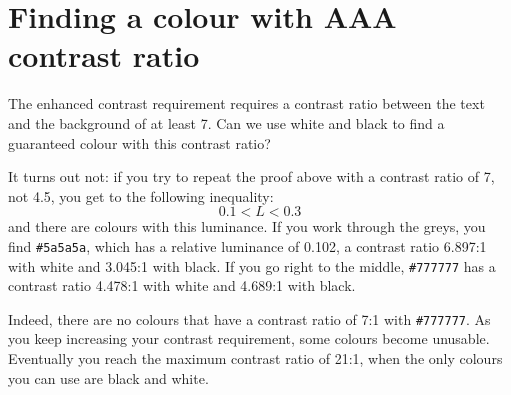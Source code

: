 \documentclass[12pt]{article}
\begin{document}

  \section*{Finding a colour with AAA contrast ratio} %
  \label{sec:finding_a_colour_with_aaa_contrast_ratio}

  The enhanced contrast requirement requires a contrast ratio between the text and the background of at least 7.
  Can we use white and black to find a guaranteed colour with this contrast ratio?

  It turns out not: if you try to repeat the proof above with a contrast ratio of 7, not 4.5, you get to the following inequality:
  \begin{equation*}
    0.1 < L < 0.3
  \end{equation*}
  and there are colours with this luminance.
  If you work through the greys, you find \texttt{\#5a5a5a}, which has a relative luminance of 0.102, a contrast ratio 6.897:1 with white and 3.045:1 with black.
  If you go right to the middle, \texttt{\#777777} has a contrast ratio 4.478:1 with white and 4.689:1 with black.

  Indeed, there are no colours that have a contrast ratio of 7:1 with \texttt{\#777777}.
  As you keep increasing your contrast requirement, some colours become unusable.
  Eventually you reach the maximum contrast ratio of 21:1, when the only colours you can use are black and white.

\end{document}
